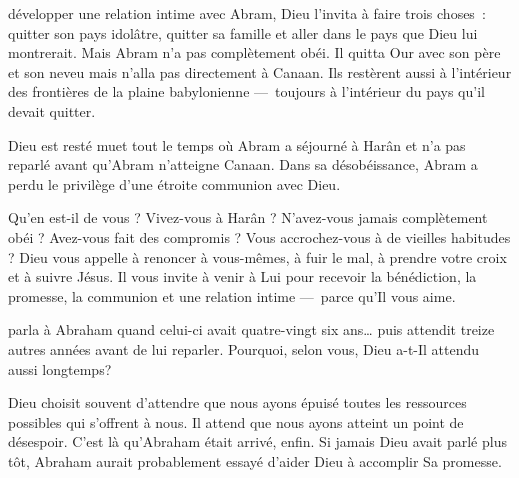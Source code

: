  développer une relation intime avec Abram,
 Dieu l'invita à faire trois choses~: quitter son pays idolâtre,
 quitter sa famille et aller dans le pays que Dieu lui montrerait.
 Mais Abram n'a pas complètement obéi.
 Il quitta Our avec son père et son neveu mais n'alla pas directement
 à Canaan.
 Ils restèrent aussi à l'intérieur des frontières de la plaine babylonienne
 ---~toujours à l'intérieur du pays qu'il devait quitter. 


Dieu est resté muet tout le temps où Abram a séjourné à Harân
 et n'a pas reparlé avant qu'Abram n'atteigne Canaan.
 Dans sa désobéissance, Abram a perdu le privilège d'une étroite
 communion avec Dieu. 

Qu'en est-il de vous ? Vivez-vous à Harân ?
 N'avez-vous jamais complètement obéi ? Avez-vous fait des compromis ?
 Vous accrochez-vous à de vieilles habitudes ?
 Dieu vous appelle à renoncer à vous-mêmes, à fuir le mal,
 à prendre votre croix et à suivre Jésus.
 Il vous invite à venir à Lui pour recevoir la bénédiction,
 la promesse, la communion et une relation intime
 ---~parce qu'Il vous aime. 

\dvrule






 parla à Abraham quand celui-ci avait quatre-vingt
 six ans\dots{} puis attendit treize autres années avant de lui reparler.
 Pourquoi, selon vous, Dieu a-t-Il attendu aussi longtemps? 

Dieu choisit souvent d'attendre que nous ayons épuisé toutes les ressources
 possibles qui s'offrent à nous.
 Il attend que nous ayons atteint un point de désespoir.
 C'est là qu'Abraham était arrivé, enfin.
 Si jamais Dieu avait parlé plus tôt, Abraham aurait probablement essayé
 d'aider Dieu à accomplir Sa promesse. 

